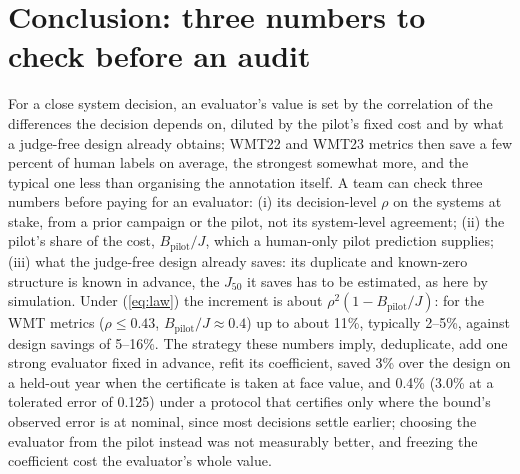 \documentclass[11pt]{article}
\newcommand{\Jt}{J_{50}}
\newcommand{\Bp}{B_{\mathrm{pilot}}}
\begin{document}
\section{Conclusion: three numbers to check before an audit}
For a close system decision, an evaluator's value is set by the correlation of the differences the decision depends on,
diluted by the pilot's fixed cost and by what a judge-free design already obtains; WMT22 and WMT23 metrics then save a
few percent of human labels on average, the strongest somewhat more, and the typical one less than organising the
annotation itself. A team can check three numbers before paying for an evaluator: (i) its decision-level $\rho$ on the
systems at stake, from a prior campaign or the pilot, not its system-level agreement; (ii) the pilot's share of the
cost, $\Bp/J$, which a human-only pilot prediction supplies; (iii) what the judge-free design already saves: its duplicate and known-zero structure is known in advance, the
$\Jt$ it saves has to be estimated, as here by simulation. Under (\ref{eq:law}) the increment is about $\rho^2(1-\Bp/J)$: for the
WMT metrics ($\rho\le0.43$, $\Bp/J\approx0.4$) up to about 11\%, typically 2--5\%, against design savings of 5--16\%. The strategy these numbers imply,
deduplicate, add one strong evaluator fixed in advance, refit its coefficient, saved 3\% over the design on a held-out
year when the certificate is taken at face value, and 0.4\% (3.0\% at a tolerated error of 0.125) under a protocol
that certifies only where the bound's observed error is at nominal, since most decisions settle earlier; choosing the evaluator from the pilot instead was not measurably better,
and freezing the coefficient cost the evaluator's whole value.
\end{document}
